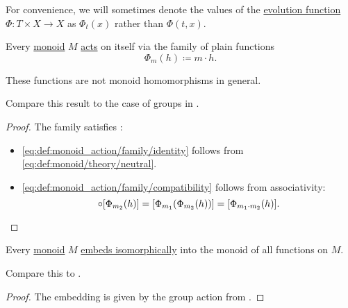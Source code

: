 \begin{remark}\label{rem:monoid_action_notation}
  For convenience, we will sometimes denote the values of the \hyperref[def:monoid_action]{evolution function} \( \Phi: T \times X \to X \) as \( \Phi_t(x) \) rather than \( \Phi(t, x) \).
\end{remark}

\begin{proposition}\label{thm:monoid_is_action}
  Every \hyperref[def:monoid]{monoid} \( M \) \hyperref[def:monoid_action]{acts} on itself via the family of plain functions
  \begin{equation*}
    \Phi_m(h) \coloneqq m \cdot h.
  \end{equation*}
\end{proposition}
\begin{comments}
  \item These functions are not monoid homomorphisms in general.
  \item Compare this result to the case of groups in .
\end{comments}
\begin{proof}
  The family satisfies :
  \begin{itemize}
    \item \ref{eq:def:monoid_action/family/identity} follows from \eqref{eq:def:monoid/theory/neutral}.

    \item \ref{eq:def:monoid_action/family/compatibility} follows from associativity:
    \begin{equation*}
      [\Phi_{m_1}(h)] \bincirc [\Phi_{m_2}(h)] = [\Phi_{m_1}(\Phi_{m_2}(h))] = [\Phi_{m_1 \cdot m_2}(h)].
    \end{equation*}
  \end{itemize}
\end{proof}

\begin{theorem}\label{thm:cayleys_theorem_for_monoids}
  Every \hyperref[def:monoid]{monoid} \( M \) \hyperref[rem:embeds_isomorphically]{embeds isomorphically} into the monoid of all functions on \( M \).
\end{theorem}
\begin{comments}
  \item Compare this to .
\end{comments}
\begin{proof}
  The embedding is given by the group action from .
\end{proof}


